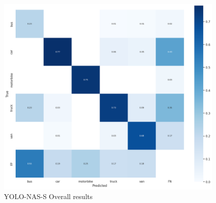\begin{figure}[H]
    \centering
    \includegraphics[width=\linewidth]{tex/img/S-Overall_or_confusionMatrix.png}
    \caption{YOLO-NAS-S Overall results }
    \label{fig:ConfusionMatrixY-N-S}
\end{figure}
